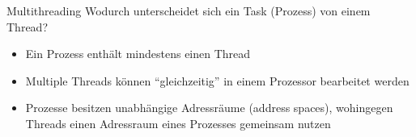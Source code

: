 \begin{aufgabe}{Multithreading}
    Wodurch unterscheidet sich ein Task (Prozess) von einem Thread?
    \tcblower
    \begin{itemize}
        \item Ein Prozess enthält mindestens einen Thread
        \item Multiple Threads können \enquote{gleichzeitig} in einem Prozessor bearbeitet werden
        \item Prozesse besitzen unabhängige Adressräume (address spaces), wohingegen Threads einen Adressraum eines Prozesses gemeinsam nutzen
    \end{itemize}
\end{aufgabe}